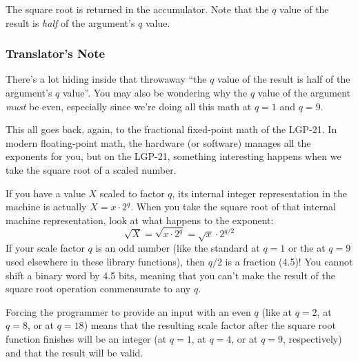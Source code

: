 The square root is returned in the accumulator. Note that the $q$ value of the result is \emph{half} of the argument's $q$ value.

\subsubsection*{Translator's Note}
\label{subsub:halfQ}
There's a lot hiding inside that throwaway ``the $q$ value of the result is half of the argument's $q$ value''. You may also be wondering why the $q$ value of the argument \emph{must} be even, especially since we're doing all this math at $q=1$ and $q=9$.

This all goes back, again, to the fractional fixed-point math of the LGP-21. In modern floating-point math, the hardware (or software) manages all the exponents for you, but on the LGP-21, something interesting happens when we take the square root of a scaled number.

If you have a value $X$ scaled to factor $q$, its internal integer representation in the machine is actually $X = x \cdot 2^q$. When you take the square root of that internal machine representation, look at what happens to the exponent:
\begin{equation}
    \sqrt{X} = \sqrt{x \cdot 2^q} = \sqrt{x} \cdot 2^{q/2}
\end{equation}
If your scale factor $q$ is an odd number (like the standard at $q=1$ or the at $q=9$ used elsewhere in these library functions), then $q/2$ is a fraction (4.5)! You cannot shift a binary word by 4.5 bits, meaning that you can't make the result of the square root operation commensurate to any $q$.

Forcing the programmer to provide an input with an even $q$ (like at $q=2$, at $q=8$, or at $q=18$) means that the resulting scale factor after the square root function finishes will be an integer (at $q=1$, at $q=4$, or at $q=9$, respectively) and that the result will be valid. 

\newpage
